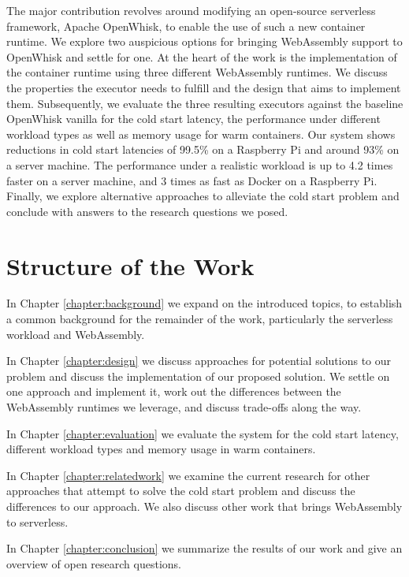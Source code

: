 The major contribution revolves around modifying an open-source serverless framework, Apache OpenWhisk, to enable the use of such a new container runtime. We explore two auspicious options for bringing WebAssembly support to OpenWhisk and settle for one. At the heart of the work is the implementation of the container runtime using three different WebAssembly runtimes. We discuss the properties the executor needs to fulfill and the design that aims to implement them. Subsequently, we evaluate the three resulting executors against the baseline OpenWhisk vanilla for the cold start latency, the performance under different workload types as well as memory usage for warm containers.
Our system shows reductions in cold start latencies of 99.5\% on a Raspberry Pi and around 93\% on a server machine. The performance under a realistic workload is up to 4.2 times faster on a server machine, and 3 times as fast as Docker on a Raspberry Pi.
Finally, we explore alternative approaches to alleviate the cold start problem and conclude with answers to the research questions we posed.


\section{Structure of the Work}

In Chapter \ref{chapter:background} we expand on the introduced topics, to establish a common background for the remainder of the work, particularly the serverless workload and WebAssembly.

In Chapter \ref{chapter:design} we discuss approaches for potential solutions to our problem and discuss the implementation of our proposed solution. We settle on one approach and implement it, work out the differences between the WebAssembly runtimes we leverage, and discuss trade-offs along the way.

In Chapter \ref{chapter:evaluation} we evaluate the system for the cold start latency, different workload types and memory usage in warm containers.

In Chapter \ref{chapter:relatedwork} we examine the current research for other approaches that attempt to solve the cold start problem and discuss the differences to our approach. We also discuss other work that brings WebAssembly to serverless.

In Chapter \ref{chapter:conclusion} we summarize the results of our work and give an overview of open research questions.
